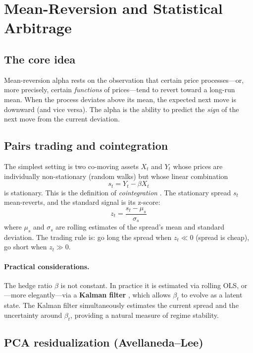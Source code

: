 \documentclass[11pt,a4paper]{article}
\begin{document}
\section{Mean-Reversion and Statistical Arbitrage}

\subsection{The core idea}

Mean-reversion alpha rests on the observation that certain price
processes---or, more precisely, certain \emph{functions} of
prices---tend to revert toward a long-run mean. When the process
deviates above its mean, the expected next move is downward (and vice
versa). The alpha is the ability to predict the \emph{sign} of the
next move from the current deviation.

\subsection{Pairs trading and cointegration}

The simplest setting is two co-moving assets $X_t$ and $Y_t$ whose
prices are individually non-stationary (random walks) but whose
linear combination
\begin{equation}
  s_t = Y_t - \beta X_t
\end{equation}
is stationary. This is the definition of \emph{cointegration}
\citep{engle1987cointegration}. The stationary spread $s_t$ mean-reverts,
and the standard signal is its z-score:
\begin{equation}
  z_t = \frac{s_t - \mu_s}{\sigma_s}
\end{equation}
where $\mu_s$ and $\sigma_s$ are rolling estimates of the spread's mean
and standard deviation. The trading rule is: go long the spread when
$z_t \ll 0$ (spread is cheap), go short when $z_t \gg 0$.

\paragraph{Practical considerations.}
The hedge ratio $\beta$ is not constant. In practice it is estimated
via rolling OLS, or---more elegantly---via a \textbf{Kalman filter}
\citep{hamilton1994time}, which allows $\beta_t$ to evolve as a latent
state. The Kalman filter simultaneously estimates the current spread
and the uncertainty around $\beta_t$, providing a natural measure of
regime stability.

\subsection{PCA residualization (Avellaneda--Lee)}
\label{sec:avellaneda}
\end{document}
